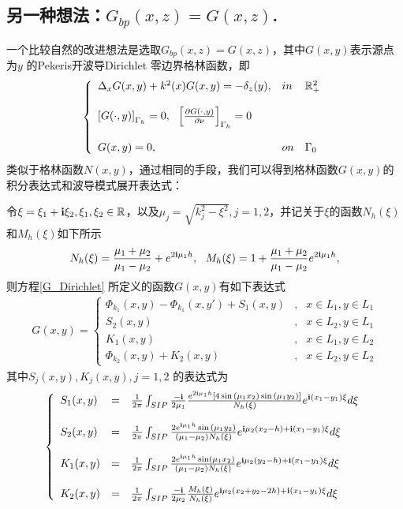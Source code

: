 \subsection{另一种想法：$G_{bp}(x,z)=G(x,z)$.}
一个比较自然的改进想法是选取$G_{bp}(x,z)=G(x,z)$，其中$G(x,y)$表示源点为$y$ 的Pekeris开波导Dirichlet 零边界格林函数，即
\begin{eqnarray}\label{G_Dirichlet}
\left\{
\begin{array}{lll}
  \Delta_xG(x,y)+k^2(x)G(x,y)=-\delta_z(y),&in&\mathbb{R}^2_+\\
  & &\\
  \left[G(\cdot,y)\right]_{\Gamma_h}=0,\ \ \left[\frac{\partial G(\cdot,y)}{\partial\nu}\right]_{\Gamma_h}=0 & &\\
  & &\\
  G(x,y)=0, &on&\Gamma_0
\end{array}
\right.
\end{eqnarray}
类似于格林函数$N(x,y)$，通过相同的手段，我们可以得到格林函数$G(x,y)$的积分表达式和波导模式展开表达式：
\begin{lemma}\label{f_Dirichlet}
令$\xi=\xi_1+\mathbf{i}\xi_2,\xi_1,\xi_2\in\mathbb{R}$，以及$\mu_j=\sqrt{k_j^2-\xi^2},j=1,2$，并记关于$\xi$的函数$N_h(\xi)$和$M_h(\xi)$如下所示
\begin{eqnarray}\label{NhMh}
 N_h(\xi)=\frac{\mu_1+\mu_2}{\mu_1-\mu_2}+e^{2\mathbf{i}\mu_1h},\ \
 M_h(\xi)=1+\frac{\mu_1+\mu_2}{\mu_1-\mu_2}e^{2\mathbf{i}\mu_1h},
\end{eqnarray}
则方程\ref{G_Dirichlet} 所定义的函数$G(x,y)$有如下表达式
\begin{eqnarray*}
G(x,y)=\left\{
\begin{array}{lll}
  \Phi_{k_1}(x,y)-\Phi_{k_1}(x,y')+S_1(x,y)&, &x\in L_1,y\in L_1\\
 S_2(x,y)&, &x\in L_2,y\in L_1\\
 K_1(x,y)&, &x\in L_1,y\in L_2\\
 \Phi_{k_2}(x,y)+K_2(x,y)&,&x\in L_2,y\in L_2
\end{array}
\right.
\end{eqnarray*}
其中$S_j(x,y),K_j(x,y),j=1,2$ 的表达式为
\begin{eqnarray*}
\left\{
\begin{array}{lll}
  S_1(x,y)&=&\frac{1}{2\pi}\int_{SIP}\frac{-\mathbf{i}}{2\mu_1}\frac{e^{2\mathbf{i}\mu_1h}\left[4\sin{(\mu_1x_2)\sin{(\mu_1y_2)}}\right]}{N_h(\xi)}
  e^{\mathbf{i}(x_1-y_1)\xi}d\xi\\
  & &\\
  S_2(x,y)&=&\frac{1}{2\pi}\int_{SIP}\frac{2e^{\mathbf{i}\mu_1h}\sin{(\mu_1y_2)}}{(\mu_1-\mu_2)N_h(\xi)}e^{\mathbf{i}\mu_2(x_2-h)+\mathbf{i}(x_1-y_1)\xi}d\xi\\
  & &\\
  K_1(x,y)&=&\frac{1}{2\pi}\int_{SIP}\frac{2e^{\mathbf{i}\mu_1h}\sin(\mu_1x_2)}{(\mu_1-\mu_2)N_h(\xi)}e^{\mathbf{i}\mu_2(y_2-h)+\mathbf{i}(x_1-y_1)\xi}d\xi\\
  & &\\
  K_2(x,y)&=&\frac{1}{2\pi}\int_{SIP}\frac{-\mathbf{i}}{2\mu_2}\frac{M_h(\xi)}{N_h(\xi)}e^{\mathbf{i}\mu_2(x_2+y_2-2h)+\mathbf{i}(x_1-y_1)\xi}d\xi
\end{array}
\right.
\end{eqnarray*}
\end{lemma}
